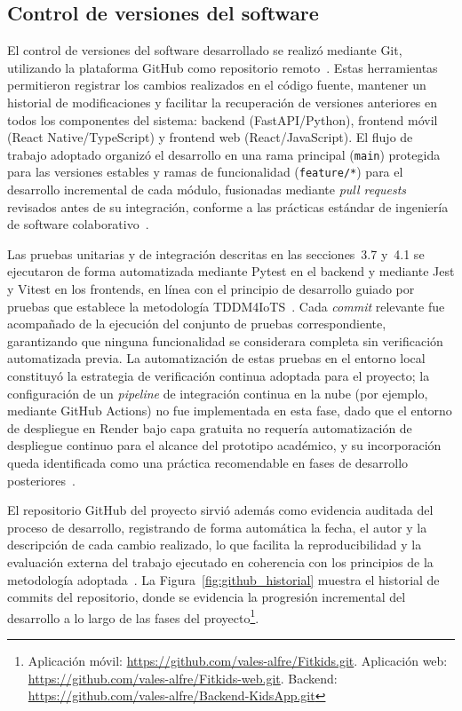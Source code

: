 			\subsection{Control de versiones del software}
				El control de versiones del software desarrollado se realizó mediante Git, utilizando la plataforma GitHub como repositorio remoto~\cite{Kleppmann2017}. Estas herramientas permitieron registrar los cambios realizados en el código fuente, mantener un historial de modificaciones y facilitar la recuperación de versiones anteriores en todos los componentes del sistema: backend (FastAPI/Python), frontend móvil (React Native/TypeScript) y frontend web (React/JavaScript). El flujo de trabajo adoptado organizó el desarrollo en una rama principal (\texttt{main}) protegida para las versiones estables y ramas de funcionalidad (\texttt{feature/*}) para el desarrollo incremental de cada módulo, fusionadas mediante \textit{pull requests} revisados antes de su integración, conforme a las prácticas estándar de ingeniería de software colaborativo~\cite{Fowler2002,Kleppmann2017}.
				
				Las pruebas unitarias y de integración descritas en las secciones~3.7 y~4.1 se ejecutaron de forma automatizada mediante Pytest en el backend y mediante Jest y Vitest en los frontends, en línea con el principio de desarrollo guiado por pruebas que establece la metodología TDDM4IoTS~\cite{GuerreroUlloa2024}. Cada \textit{commit} relevante fue acompañado de la ejecución del conjunto de pruebas correspondiente, garantizando que ninguna funcionalidad se considerara completa sin verificación automatizada previa. La automatización de estas pruebas en el entorno local constituyó la estrategia de verificación continua adoptada para el proyecto; la configuración de un \textit{pipeline} de integración continua en la nube (por ejemplo, mediante GitHub Actions) no fue implementada en esta fase, dado que el entorno de despliegue en Render bajo capa gratuita no requería automatización de despliegue continuo para el alcance del prototipo académico, y su incorporación queda identificada como una práctica recomendable en fases de desarrollo posteriores~\cite{Fowler2002}.
				
				El repositorio GitHub del proyecto sirvió además como evidencia auditada del proceso de desarrollo, registrando de forma automática la fecha, el autor y la descripción de cada cambio realizado, lo que facilita la reproducibilidad y la evaluación externa del trabajo ejecutado en coherencia con los principios de la metodología adoptada~\cite{Kleppmann2017,GuerreroUlloa2024}. La Figura~\ref{fig:github_historial} muestra el historial de commits del repositorio, donde se evidencia la progresión incremental del desarrollo a lo largo de las fases del proyecto\footnote{Aplicación móvil: \url{https://github.com/vales-alfre/Fitkids.git}. Aplicación web: \url{https://github.com/vales-alfre/Fitkids-web.git}. Backend: \url{https://github.com/vales-alfre/Backend-KidsApp.git}}.
				
